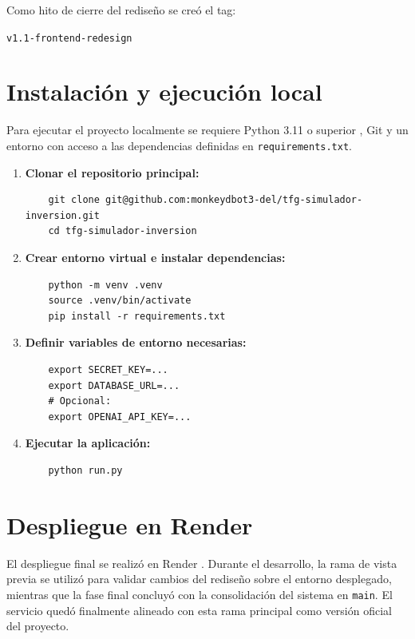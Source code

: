 Como hito de cierre del rediseño se creó el tag:
\begin{center}
\texttt{v1.1-frontend-redesign}
\end{center}

\section{Instalación y ejecución local}

Para ejecutar el proyecto localmente se requiere Python 3.11 o superior \cite{python}, Git \cite{progit} y un entorno con acceso a las dependencias definidas en \texttt{requirements.txt}.

\begin{enumerate}
    \item \textbf{Clonar el repositorio principal:}
    \begin{verbatim}
    git clone git@github.com:monkeydbot3-del/tfg-simulador-inversion.git
    cd tfg-simulador-inversion
    \end{verbatim}

    \item \textbf{Crear entorno virtual e instalar dependencias:}
    \begin{verbatim}
    python -m venv .venv
    source .venv/bin/activate
    pip install -r requirements.txt
    \end{verbatim}

    \item \textbf{Definir variables de entorno necesarias:}
    \begin{verbatim}
    export SECRET_KEY=...
    export DATABASE_URL=...
    # Opcional:
    export OPENAI_API_KEY=...
    \end{verbatim}

    \item \textbf{Ejecutar la aplicación:}
    \begin{verbatim}
    python run.py
    \end{verbatim}
\end{enumerate}

\section{Despliegue en Render}

El despliegue final se realizó en Render \cite{render}. Durante el desarrollo, la rama de vista previa se utilizó para validar cambios del rediseño sobre el entorno desplegado, mientras que la fase final concluyó con la consolidación del sistema en \texttt{main}. El servicio quedó finalmente alineado con esta rama principal como versión oficial del proyecto.

